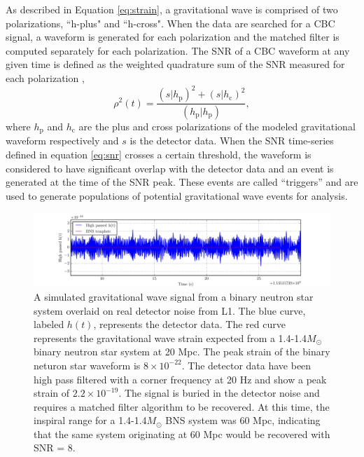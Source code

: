 As described in Equation \ref{eq:strain}, a gravitational wave is comprised of two 
polarizations, ``h-plus" and ``h-cross". When the data are searched for a CBC  
signal, a waveform is generated for each polarization and the matched filter is 
computed separately for each polarization. 
The SNR of a CBC waveform at any given time is defined as the weighted quadrature sum 
of the SNR measured for each polarization \cite{Usman:2015kfa}, 
\begin{equation}
\rho^2(t) = \frac{(s|h_\mathrm{p})^2 + (s|h_\mathrm{c})^2}{(h_\mathrm{p}|h_\mathrm{p})},
\label{eq:snr}
\end{equation}
where $h_\mathrm{p}$ and $h_\mathrm{c}$ are the plus and cross polarizations of the 
modeled gravitational waveform respectively and $s$ is the detector data. 
When the SNR time-series defined in equation \ref{eq:snr} crosses a certain threshold, 
the waveform is considered to have significant overlap with the detector data and an 
event is generated at the time of the SNR peak. These events are called ``triggers'' 
and are used to generate populations of potential gravitational wave events for analysis.

\begin{figure}[ht!]
\includegraphics[width=\textwidth]{figures/introduction/quiet_BNS}
\caption[BNS signal in detector noise]{A simulated gravitational wave signal from a %
         binary neutron star system overlaid on real detector noise from L1. %
         The blue curve, labeled $h(t)$, represents the detector data. %
         The red curve represents %
         the gravitational wave strain expected from a 1.4-1.4$M_{\odot}$ %
         binary neutron star system %
         at 20 Mpc. The peak strain of the binary neturon star waveform is %
         $8\times10^{-22}$. %
         The detector data have been high pass filtered with a corner frequency %
         at 20 Hz and show a peak strain of $2.2\times10^{-19}$. The signal is %
         buried in the detector noise and requires a matched filter algorithm %
         to be recovered. At this time, the inspiral range for a 1.4-1.4$M_{\odot}$ %
         BNS system was 60 Mpc, indicating that the same system originating at 60 Mpc %
         would be recovered with SNR = 8. %
         }
\label{fig:quiet-BNS}
\end{figure}

